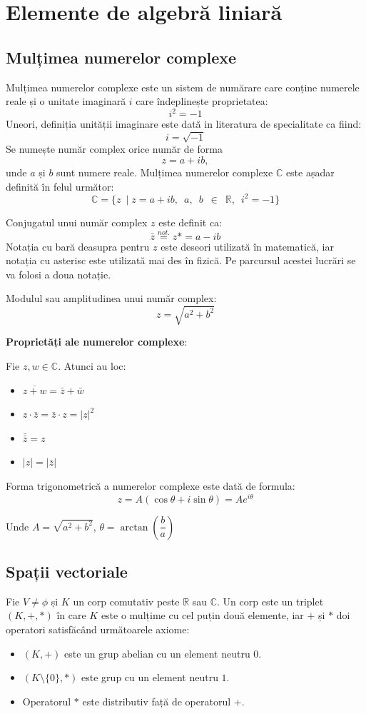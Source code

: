 \section{Elemente de algebră liniară}

\subsection{Mulțimea numerelor complexe}

Mulțimea numerelor complexe este un sistem de numărare care conține numerele reale și o unitate imaginară $i$ care îndeplinește proprietatea:
\[i^2 = -1\]
Uneori, definiția unității imaginare este dată in literatura de specialitate ca fiind: \[i = \sqrt{-1}\]
Se numește număr complex orice număr de forma \[z = a + ib,\] unde $a$ și $b$ sunt numere reale. Mulțimea numerelor complexe $\mathbb{C}$ este așadar definită în felul următor: 
\[ \mathbb{C} = \{z \enspace|\; z = a + ib,\enspace a,\enspace b \enspace\in\enspace \mathbb{R},\enspace i^2 = -1\} \]

Conjugatul unui număr complex $z$ este definit ca:
\[\bar{z} \overset{not.}{=} z\text{*} = a - ib\]
Notația cu bară deasupra pentru $z$ este deseori utilizată în matematică, iar notația cu asterisc este utilizată mai des în fizică. Pe parcursul acestei lucrări se va folosi a doua notație.

Modulul sau amplitudinea unui număr complex:
\[z = \sqrt{a^2 + b^2}\]

\textbf{Proprietăți ale numerelor complexe}:

Fie $z, w \in \mathbb{C}$. Atunci au loc:
\begin{itemize}
    \item $\overline{z + w} = \bar{z} + \bar{w}$ 
    \item $z \cdot \bar{z} = \bar{z} \cdot z = |z|^2$
    \item $\bar{\bar{z}} = z$
    \item $|z| = |\bar{z}|$
\end{itemize}
\pagebreak

Forma trigonometrică a numerelor complexe este dată de formula:
\[z = A(\cos \theta + i \sin \theta) = Ae^{i\theta}\] 

Unde $A = \sqrt{a^2 + b^2}$,  $\theta = \arctan\left(\dfrac{b}{a}\right)$

\subsection{Spații vectoriale}
Fie $V \neq \phi$ și $K$ un corp comutativ peste $\mathbb{R}$ sau $\mathbb{C}$. Un corp este un triplet $(K, +, *)$ în care $K$ este o mulțime cu cel puțin două elemente, iar $+$ și $*$ doi operatori satisfăcând următoarele axiome:
\begin{itemize}
    \item $(K,+)$ este un grup abelian cu un element neutru $0$.
    \item $(K \setminus \{0\}, *)$ este grup cu un element neutru $1$.
    \item Operatorul $*$ este distributiv față de operatorul $+$.
\end{itemize}

